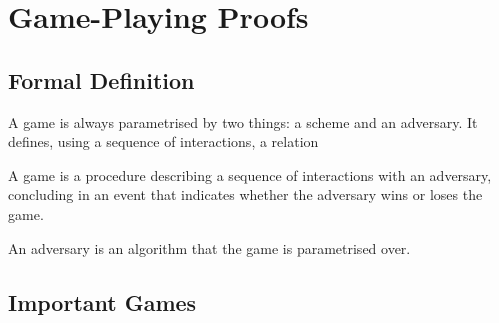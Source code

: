 \chapter{Game-Playing Proofs}


\section{Formal Definition}

A game is always parametrised by two things: a scheme and an adversary.  It defines, using a sequence of interactions, a
relation 

A game is a procedure describing a sequence of interactions with an adversary, concluding in an event that indicates
whether the adversary wins or loses the game.

An adversary is an algorithm that the game is parametrised over.



\section{Important Games}

